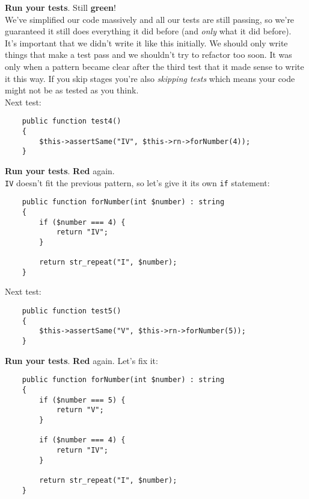 \textbf{Run your tests}. Still \textbf{green}!
\\

We've simplified our code massively and all our tests are still passing, so we're guaranteed it still does everything it did before (and \textit{only} what it did before).
\\

It's important that we didn't write it like this initially. We should only write things that make a test pass and we shouldn't try to refactor too soon. It was only when a pattern became clear after the third test that it made sense to write it this way. If you skip stages you're also \textit{skipping tests} which means your code might not be as tested as you think.
\\


Next test:

\begin{verbatim}
    public function test4()
    {
        $this->assertSame("IV", $this->rn->forNumber(4));
    }
\end{verbatim}

\textbf{Run your tests}. \textbf{Red} again.
\\

\texttt{IV} doesn't fit the previous pattern, so let's give it its own \texttt{if} statement:

\begin{verbatim}
    public function forNumber(int $number) : string
    {
        if ($number === 4) {
            return "IV";
        }

        return str_repeat("I", $number);
    }
\end{verbatim}


Next test:

\begin{verbatim}
    public function test5()
    {
        $this->assertSame("V", $this->rn->forNumber(5));
    }
\end{verbatim}

\textbf{Run your tests}. \textbf{Red} again. Let's fix it:

\begin{verbatim}
    public function forNumber(int $number) : string
    {
        if ($number === 5) {
            return "V";
        }

        if ($number === 4) {
            return "IV";
        }

        return str_repeat("I", $number);
    }
\end{verbatim}


